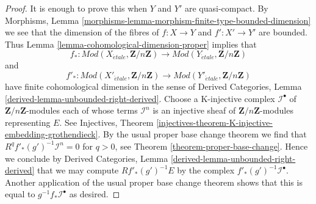 \documentclass[10pt,a4paper]{amsart}
\theoremstyle{plain}
\theoremstyle{definition}
\theoremstyle{remark}
\numberwithin{equation}{subsection}
\def\etale{{\acute{e}tale}}
\begin{document}
\begin{proof}
It is enough to prove this when $Y$ and $Y'$ are quasi-compact.
By Morphisms, Lemma
\ref{morphisms-lemma-morphism-finite-type-bounded-dimension}
we see that the dimension of the fibres of
$f : X \to Y$ and $f' : X' \to Y'$ are bounded. Thus
Lemma \ref{lemma-cohomological-dimension-proper} implies that
$$
f_* :
\textit{Mod}(X_\etale, \mathbf{Z}/n\mathbf{Z})
\longrightarrow
\textit{Mod}(Y_\etale, \mathbf{Z}/n\mathbf{Z})
$$
and
$$
f'_* :
\textit{Mod}(X'_\etale, \mathbf{Z}/n\mathbf{Z})
\longrightarrow
\textit{Mod}(Y'_\etale, \mathbf{Z}/n\mathbf{Z})
$$
have finite cohomological dimension in the sense of
Derived Categories, Lemma \ref{derived-lemma-unbounded-right-derived}.
Choose a K-injective complex $\mathcal{I}^\bullet$
of $\mathbf{Z}/n\mathbf{Z}$-modules each of whose
terms $\mathcal{I}^n$ is an injective sheaf of
$\mathbf{Z}/n\mathbf{Z}$-modules representing $E$.
See Injectives, Theorem
\ref{injectives-theorem-K-injective-embedding-grothendieck}.
By the usual proper base change theorem we find
that $R^qf'_*(g')^{-1}\mathcal{I}^n = 0$ for $q > 0$, see
Theorem \ref{theorem-proper-base-change}.
Hence we conclude by 
Derived Categories, Lemma \ref{derived-lemma-unbounded-right-derived}
that we may compute $Rf'_*(g')^{-1}E$ by the complex
$f'_*(g')^{-1}\mathcal{I}^\bullet$. Another application
of the usual proper base change theorem shows that
this is equal to $g^{-1}f_*\mathcal{I}^\bullet$ as desired.
\end{proof}
\end{document}
